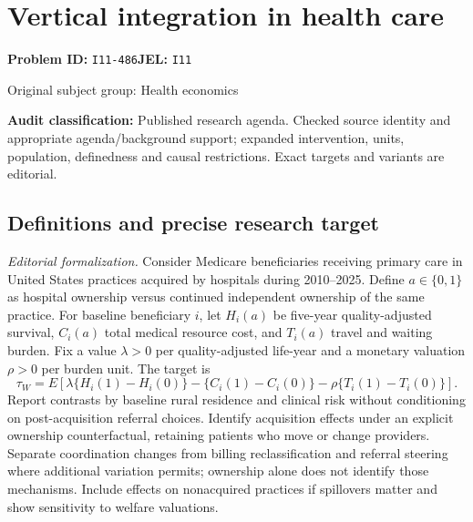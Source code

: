 \documentclass[11pt,a4paper]{article}
\begin{document}
\section*{Vertical integration in health care}
\textbf{Problem ID:} \texttt{I11-486}\quad \textbf{JEL:} \texttt{I11}\par
\label{problem:OP-0441}
{\sffamily\small\color{muted}Original subject group: Health economics\par}
\label{definitions:problem:30007723}
\textbf{Audit classification:} Published research agenda. Checked source identity and appropriate agenda/background support; expanded intervention, units, population, definedness and causal restrictions. Exact targets and variants are editorial.
\subsection*{Definitions and precise research target}
\textit{Editorial formalization.} Consider Medicare beneficiaries receiving primary care in United States practices acquired by hospitals during 2010–2025. Define \(a\in\{0,1\}\) as hospital ownership versus continued independent ownership of the same practice. For baseline beneficiary \(i\), let \(H_i(a)\) be five-year quality-adjusted survival, \(C_i(a)\) total medical resource cost, and \(T_i(a)\) travel and waiting burden. Fix a value \(\lambda>0\) per quality-adjusted life-year and a monetary valuation \(\rho>0\) per burden unit. The target is
\[\tau_W=E[\lambda\{H_i(1)-H_i(0)\}-\{C_i(1)-C_i(0)\}-\rho\{T_i(1)-T_i(0)\}].\]
Report contrasts by baseline rural residence and clinical risk without conditioning on post-acquisition referral choices. Identify acquisition effects under an explicit ownership counterfactual, retaining patients who move or change providers. Separate coordination changes from billing reclassification and referral steering where additional variation permits; ownership alone does not identify those mechanisms. Include effects on nonacquired practices if spillovers matter and show sensitivity to welfare valuations.
\end{document}
